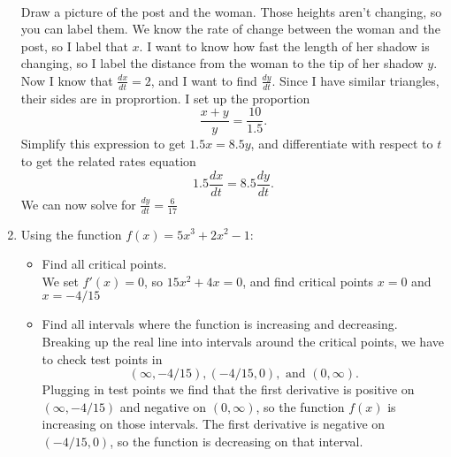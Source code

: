 \documentclass{exam}
\begin{document}
\begin{enumerate}
\\
Draw a picture of the post and the woman. Those heights aren't changing, so you can label them. We know the rate of change between the woman and the post, so I label that $x$. I want to know how fast the length of her shadow is changing, so I label the distance from the woman to the tip of her shadow $y$. Now I know that $\frac{dx}{dt} = 2$, and I want to find $\frac{dy}{dt}$. Since I have similar triangles, their sides are in proprortion. I set up the proportion
$$\frac{x + y}{y} = \frac{10}{1.5}.$$ Simplify this expression to get $1.5x = 8.5y$, and differentiate with respect to $t$ to get the related rates equation $$1.5 \frac{dx}{dt} = 8.5 \frac{dy}{dt}.$$ We can now solve for $\frac{dy}{dt} = \frac{6}{17}$ 
\item  Using the function $f(x) = 5x^3 + 2x^2 - 1$:
\begin{itemize}
\item Find all critical points.\\
We set $f'(x) = 0$, so $15x^2 + 4x = 0$, and find critical points $x = 0$ and $x = -4/15$
\item Find all intervals where the function is increasing and decreasing.\\
Breaking up the real line into intervals around the critical points, we have to check test points in $$(\infty, -4/15), (-4/15,0), \mbox{ and } (0, \infty).$$ Plugging in test points we find that the first derivative is positive on $(\infty, -4/15)$ and negative on $(0, \infty)$, so the function $f(x)$ is increasing on those intervals. The first derivative is negative on $(-4/15,0)$, so the function is decreasing on that interval.

\end{itemize}
\end{enumerate}
\end{document}
